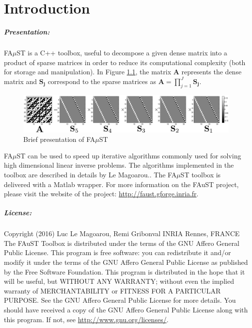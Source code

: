 \chapter{Introduction}\label{sec:intro}

\paragraph{Presentation:}FA$\mu$ST is a C++ toolbox, useful to decompose a given dense matrix into a product of sparse matrices in order to reduce its computational complexity (both for storage and manipulation). In Figure \ref{fig:presentation}, the matrix \textbf{A} represents the dense matrix and $\mathbf{S_j}$ correspond to the sparse matrices as $\mathbf{A}=\prod_{j=1}^J\mathbf{S_j}$.

\begin{figure}[H] %
\centering
\includegraphics[scale=0.5]{images/hadamard32_bw.pdf}
\caption{Brief presentation of FA$\mu$ST}
\label{fig:presentation}
\end{figure}

FA$\mu$ST can be used to speed up iterative algorithms commonly used for solving high dimensional linear inverse problems. The algorithms implemented in the toolbox are described in details by Le Magoarou.\cite{LeMagoarou2016}.
The FA$\mu$ST toolbox is delivered with a Matlab wrapper. 
For more information on the FAuST project, please visit the website of the project: \url{http://faust.gforge.inria.fr}.



\paragraph{License:}Copyright (2016) Luc Le Magoarou, Remi Gribonval INRIA Rennes, FRANCE \\
The FAuST Toolbox is distributed under the terms of the GNU Affero General Public License. This program is free software: you can redistribute it and/or modify it under the terms of the GNU Affero General Public License as published by the Free Software Foundation. This program is distributed in the hope that it will be useful, but WITHOUT ANY WARRANTY; without even the implied warranty of MERCHANTABILITY or FITNESS FOR A PARTICULAR PURPOSE.  See the GNU Affero General Public License for more details. You should have received a copy of the GNU Affero General Public License along with this program.  If not, see \url{http://www.gnu.org/licenses/}.

